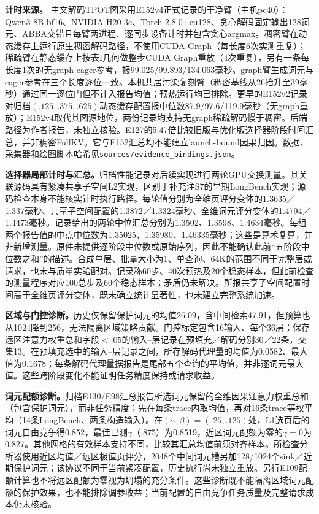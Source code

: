 \documentclass[10pt,letterpaper]{article}
\begin{document}
\textbf{计时来源。} 主文解码TPOT图采用E152v4正式记录的干净臂（主机pc40）：Qwen3-8B bf16、NVIDIA H20-3e、Torch 2.8.0+cu128、贪心解码固定输出128词元、ABBA交错且每臂两进程、逐同步设备计时并包含贪心argmax。稠密臂在动态缓存上运行原生稠密解码路径，不使用CUDA Graph（每长度6次实测重复）；稀疏臂在静态缓存上按表I几何做整步CUDA Graph重放（4次重复），另有一条每长度1次的无graph eager参考，报99.025/99.893/134.063毫秒。graph臂生成词元与eager参考在三个长度逐位一致。本机共居污染复刻臂（稠密基线从26抬升至39毫秒）通过同一逐位门但不计入报告均值；预热运行均已排除。更早的E152v2记录对归档$(.125,.375,.625)$动态缓存配置报中位数87.9/97.6/119.9毫秒（无graph重放）；E152v4取代其图源地位，两份记录均支持无graph稀疏解码慢于稠密。后端路径为作者报告，未独立核验。E127的5.47倍比较旧版与优化版选择器阶段时间汇总，并非稠密FullKV。它与E152汇总均不能建立launch-bound因果归因。数据、采集器和绘图脚本哈希见\texttt{sources/evidence\_bindings.json}。

\textbf{选择器局部计时与汇总。}归档性能记录对后续实现进行两轮GPU交换测量。其关联源码具有紧凑共享子空间L2实现，区别于补充注S7的早期LongBench实现；源码检查本身不能核实计时执行路径。每轮值分别为全维页评分变体的1.3635／1.337毫秒、共享子空间配置的1.3872／1.3324毫秒、全维词元评分变体的1.4794／1.4473毫秒。记录给出的两轮中位汇总分别为1.3502、1.3598、1.4634毫秒。每组两个报告值的中点中位数为1.35025、1.35980、1.46335毫秒；这些是算术复算，并非新增测量。原件未提供逐阶段中位数或原始序列，因此不能确认此前“五阶段中位数之和”的描述。合成单层、批量大小为1、单查询、64K的范围不同于完整层或请求，也未与质量实验配对。记录称60步、40次预热及20个稳态样本，但此前检查的测量程序对应100总步及60个稳态样本；矛盾仍未解决。所报共享子空间配置时间高于全维页评分变体，既未确立统计显著性，也未建立完整系统加速。

\textbf{区域与门控诊断。}历史仅保留保护词元的均值26.09，含中间检索47.91，但预算也从1024降到256，无法隔离区域策略贡献。门控标定包含16输入、每个36层；保存远区注意力权重总和字段$<.05$的输入--层记录在预填充／解码分别30／22条，交集13。在预填充选中的输入--层记录之间，所存解码代理量的均值为0.0582、最大值为0.1678；每条解码代理量据报告是尾部五个查询的平均值，并非逐词元最大值。这些跨阶段变化不能证明任务精度保持或请求收益。

\textbf{词元配额诊断。}归档E130/E98汇总报告所选词元保留的全维因果注意力权重总和（包含保护词元），而非任务精度；先在每条trace内取均值，再对16条trace等权平均（14条LongBench、两条构造输入）。在$(\alpha,\beta)=(.25,.125)$处，L1选页后的词元自由竞争得0.852，最佳已测$\gamma$（.875）为0.8519，近区词元配额为零的$\gamma=0$为0.827。其他网格的有效样本支持不同，比较其汇总均值前须对齐样本。所检查分析器使用近区均值／远区极值页评分，2048个中间词元槽另加128/1024个sink／近期保护词元；该协议不同于当前紧凑配置，历史执行尚未独立重放。另行E109配额计算也不将远区配额为零视为坍塌的充分条件。这些诊断既不能隔离区域词元配额的保护效果，也不能排除调参收益；当前配置的自由竞争任务质量及完整请求成本仍未核验。
\end{document}
